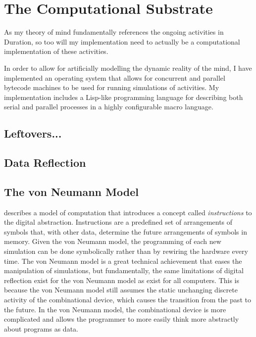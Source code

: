 \chapter{The Computational Substrate}
\label{chapter:the_computational_substrate}

As my theory of mind fundamentally references the ongoing activities
in Duration, so too will my implementation need to actually be a
computational implementation of these activities.

In order to allow for artificially modelling the dynamic reality of
the mind, I have implemented an operating system that allows for
concurrent and parallel bytecode machines to be used for running
simulations of activities.  My implementation includes a Lisp-like
programming language for describing both serial and parallel processes
in a highly configurable macro language.



\section{Leftovers...}

\section{Data Reflection}



\section{The von Neumann Model}

\cite{von_neumann:1945} describes a model of computation that
introduces a concept called \emph{instructions} to the digital
abstraction.  Instructions are a predefined set of arrangements of
symbols that, with other data, determine the future arrangements of
symbols in memory.  Given the von Neumann model, the programming of
each new simulation can be done symbolically rather than by rewiring
the hardware every time.  The von Neumann model is a great technical
achievement that eases the manipulation of simulations, but
fundamentally, the same limitations of digital reflection exist for
the von Neumann model as exist for all computers.  This is because the
von Neumann model still assumes the static unchanging discrete
activity of the combinational device, which causes the transition from
the past to the future.  In the von Neumann model, the combinational
device is more complicated and allows the programmer to more easily
think more abstractly about programs as data.

